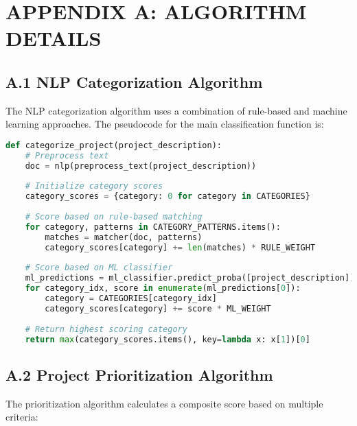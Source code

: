 \documentclass[12pt,a4paper]{report}
\begin{document}
\chapter{APPENDIX A: ALGORITHM DETAILS}

\section*{A.1 NLP Categorization Algorithm}
\indent \indent The NLP categorization algorithm uses a combination of rule-based and machine learning approaches. The pseudocode for the main classification function is:

\begin{lstlisting}[language=Python]
def categorize_project(project_description):
    # Preprocess text
    doc = nlp(preprocess_text(project_description))
    
    # Initialize category scores
    category_scores = {category: 0 for category in CATEGORIES}
    
    # Score based on rule-based matching
    for category, patterns in CATEGORY_PATTERNS.items():
        matches = matcher(doc, patterns)
        category_scores[category] += len(matches) * RULE_WEIGHT
    
    # Score based on ML classifier
    ml_predictions = ml_classifier.predict_proba([project_description])
    for category_idx, score in enumerate(ml_predictions[0]):
        category = CATEGORIES[category_idx]
        category_scores[category] += score * ML_WEIGHT
    
    # Return highest scoring category
    return max(category_scores.items(), key=lambda x: x[1])[0]
\end{lstlisting}

\section*{A.2 Project Prioritization Algorithm}
\indent \indent The prioritization algorithm calculates a composite score based on multiple criteria:
\end{document}
